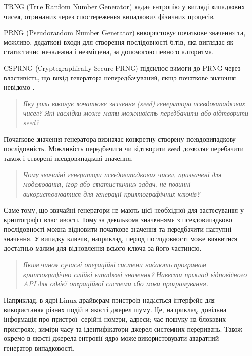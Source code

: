 \documentclass{kpi-lab}
\begin{document}
TRNG (True Random Number Generator)
надає ентропію у вигляді випадкових чисел, отриманих через
спостереження випадкових фізичних процесів. \cite{Bartock2022}

PRNG (Pseudorandom Number Generator)
використовує початкове значення
та, можливо, додаткові входи для створення
послідовності бітів, яка виглядає як статистично незалежна
і незміщена, за допомогою певного алгоритма.

CSPRNG (Cryptographically Secure PRNG) підсилює вимоги до
PRNG через властивість, що вихід генератора непередбачуваний,
якщо початкове значення невідомо \cite{Barker2020a}.

\begin{quote}\small\it
  Яку роль виконує початкове значення (seed) генератора
  псевдовипадкових чисел? Які наслідки може мати можливість
  передбачити або відтворити seed?
\end{quote}

Початкове значення генератора визначає конкретну
створену псевдовипадкову послідовність.
Можливість передбачити чи відтворити seed дозволяє
перебачити також і створені псевдовипадкові значення.

\begin{quote}\small\it
  Чому звичайні генератори псевдовипадкових чисел,
  призначені для моделювання, ігор або статистичних задач,
  не повинні використовуватися для генерації криптографічних ключів?
\end{quote}

Саме тому, що звичайні генератори не мають цієї необхідної
для застосування у криптографії властивості.
Тому за декількома значеннями з псевдовипадкової послідовності
можна відновити початкове значення та передбачити наступні значення.
У випадку ключів, наприклад, період послідовності може виявитися
достатньо малим для відновлення всього ключа за його частиною.

\begin{quote}\small\it
  Яким чином сучасні операційні системи надають програмам
  криптографічно стійкі випадкові значення? Навести приклад
  відповідного API для однієї операційної системи або мови
  програмування.
\end{quote}

Наприклад, в ядрі Linux драйверам пристроїв надається інтерфейс для
використання різних подій в якості джерел шуму. Це, наприклад,
довільна інформація про пристрої, серійні номери, адреси;
час пошуку на блокових пристроях; виміри часу та
ідентифікатори джерел системних переривань.
Також окремо в якості джерела ентропії ядро може
використовувати апаратний генератор випадковості.
\end{document}
